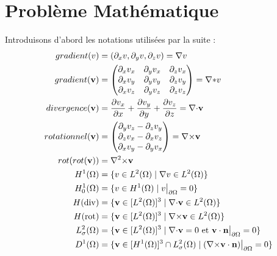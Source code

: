 \part{Problème Mathématique}
\label{partProb}
Introduisons d'abord les notations utilisées par la suite :
\begin{align*}
gradient(v)&=(\partial_x v, \partial_y v, \partial_z v)={\nabla} v\\
gradient(\mathbf{v})&=\begin{pmatrix}
\partial_x v_x & \partial_y v_x & \partial_z v_x\\
\partial_x v_y & \partial_y v_y & \partial_z v_y\\
\partial_x v_z & \partial_y v_z & \partial_z v_z
\end{pmatrix}={\nabla}\mathbf*{v}\\
divergence(\mathbf{v})&=\frac{\partial v_x}{\partial x}+\frac{\partial v_y}{\partial y}+\frac{\partial v_z}{\partial z}={\nabla\cdot} \mathbf{v}\\
rotationnel(\mathbf{v})&=\begin{pmatrix}
\partial_y v_z - \partial_z v_y\\
\partial_z v_x - \partial_x v_z\\
\partial_x v_y - \partial_y v_x
\end{pmatrix}={\nabla\times} \mathbf{v}\\
rot(rot(\mathbf{v}))&={\nabla^2\times} \mathbf{v}\\
H^1(\Omega) &= \{v \in L^2(\Omega)\;|\; {\nabla} v\in L^2(\Omega)\}\\
H^1_0(\Omega) &= \{v \in H^1(\Omega)\; |\; v{\big\rvert_{\partial\Omega}} = 0\}\\
H(\mathrm{div}) &= \{\mathbf{v} \in [L^2(\Omega)]^3\; |\; {\nabla\cdot}\mathbf{v} \in L^2(\Omega) \}\\
H(\mathrm{rot}) &= \{\mathbf{v} \in [L^2(\Omega)]^3\; |\; {\nabla\times}\mathbf{v} \in L^2(\Omega) \}\\
L^2_\sigma(\Omega) &= \{\mathbf{v} \in [L^2(\Omega)]^3\; |\; {\nabla\cdot} \mathbf{v} = 0\text{ et }\mathbf{v}\cdot \mathbf{n}{\big\rvert_{\partial\Omega}} = 0 \}\\
D^1(\Omega) &= \{\mathbf{v} \in [H^1(\Omega)]^3\cap L^2_\sigma(\Omega)\; |\; ({\nabla\times} \mathbf{v}\cdot \mathbf{n}){\big\rvert_{\partial\Omega}} = 0  \}
\end{align*}

